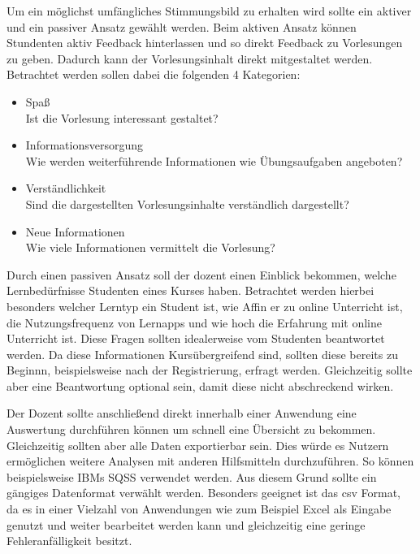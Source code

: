 Um ein möglichst umfängliches Stimmungsbild zu erhalten wird sollte ein aktiver und ein passiver Ansatz gewählt werden.
Beim aktiven Ansatz können Stundenten aktiv Feedback hinterlassen und so direkt Feedback zu Vorlesungen zu geben. Dadurch kann der Vorlesungsinhalt direkt mitgestaltet werden. Betrachtet werden sollen dabei die folgenden 4 Kategorien:
\begin{itemize}
    \item Spaß\\
        Ist die Vorlesung interessant gestaltet?
    \item Informationsversorgung\\
        Wie werden weiterführende Informationen wie Übungsaufgaben angeboten?
    \item Verständlichkeit\\
        Sind die dargestellten Vorlesungsinhalte verständlich dargestellt?
    \item Neue Informationen\\
        Wie viele Informationen vermittelt die Vorlesung?
\end{itemize}


Durch einen passiven Ansatz soll der dozent einen Einblick bekommen, welche Lernbedürfnisse Studenten eines Kurses haben.
Betrachtet werden hierbei besonders welcher Lerntyp ein Student ist, wie Affin er zu online Unterricht ist, die Nutzungsfrequenz von Lernapps und wie hoch die Erfahrung mit online Unterricht ist.
Diese Fragen sollten idealerweise vom Studenten beantwortet werden. Da diese Informationen Kursübergreifend sind, sollten diese bereits zu Beginnn, beispielsweise nach der Registrierung, erfragt werden.
Gleichzeitig sollte aber eine Beantwortung optional sein, damit diese nicht abschreckend wirken.

Der Dozent sollte anschließend direkt innerhalb einer Anwendung eine Auswertung durchführen können um schnell eine Übersicht zu bekommen. Gleichzeitig sollten aber alle Daten exportierbar sein. Dies würde es Nutzern ermöglichen weitere Analysen mit anderen Hilfsmitteln durchzuführen. So können beispielsweise IBMs SQSS verwendet werden.
Aus diesem Grund sollte ein gängiges Datenformat verwählt werden. 
Besonders geeignet ist das csv Format, da es in einer Vielzahl von Anwendungen wie zum Beispiel Excel als Eingabe genutzt und weiter bearbeitet werden kann und gleichzeitig eine geringe Fehleranfälligkeit besitzt.




























